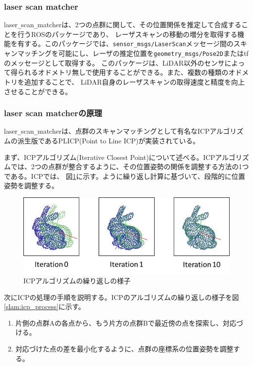 \clearpage

\subsubsection{laser scan matcher}
laser\verb|_|scan\verb|_|matcherは、2つの点群に関して、その位置関係を推定して合成することを行うROSのパッケージであり、
レーザスキャンの移動の増分を取得する機能を有する。このパッケージでは、\verb|sensor_msgs/LaserScan|メッセージ間のスキャンマッチングを可能にし、レーザの推定位置を\verb|geometry_msgs/Pose2D|またはtfのメッセージとして取得する。
このパッケージは、LiDAR以外のセンサによって得られるオドメトリ無しで使用することができる。また、複数の種類のオドメトリを追加することで、
LiDAR自身のレーザスキャンの取得速度と精度を向上させることができる。

\subsubsection{laser scan matcherの原理}
laser\verb|_|scan\verb|_|matcherは、点群のスキャンマッチングとして有名なICPアルゴリズム\cite{slam:icp}の派生版であるPLICP(Point to Line ICP)\cite{slam:plicp}が実装されている。

まず、ICPアルゴリズム(Iterative Closest Point)について述べる。ICPアルゴリズムでは、2つの点群が整合するように、その位置姿勢の関係を調整する方法の1つである。ICPでは、
図\ref{slam:icp1}に示す。ように繰り返し計算に基づいて、段階的に位置姿勢を調整する。

\begin{figure}[h]
  \begin{center}
    \includegraphics[width=.8\linewidth]{img/slam_24.jpg}
    \caption{ICPアルゴリズムの繰り返しの様子}
    \label{slam:icp1}
  \end{center}
\end{figure}

次にICPの処理の手順を説明する。ICPのアルゴリズムの繰り返しの様子を図\ref{slam:icp_process}に示す。
\begin{enumerate}
  \item 片側の点群Aの各点から、もう片方の点群Bで最近傍の点を探索し、対応づける。
  \item 対応づけた点の差を最小化するように、点群の座標系の位置姿勢を調整する。
\end{enumerate}

